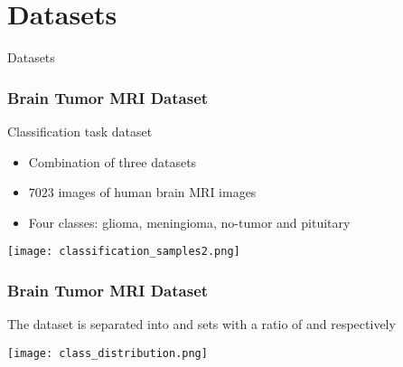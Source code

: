 \documentclass[../presentation.tex]{subfiles} %
\begin{document}
\section{Datasets}

\begin{frame}
	\begin{cbox}
		{\fontsize{20pt}{7.2}\selectfont Datasets}
	\end{cbox}
\end{frame}

\begin{frame}

    \frametitle{Brain Tumor MRI Dataset}

		Classification task dataset

    \begin{cbox}
        \begin{itemize}
            \item Combination of three datasets
            \item $7023$ images of human brain MRI images
            \item Four classes: glioma, meningioma, no-tumor and pituitary
        \end{itemize}
    \end{cbox}


    \begin{center}
        \texttt{[image: classification\_samples2.png]}
    \end{center}

\end{frame}

\begin{frame}
    
    \frametitle{Brain Tumor MRI Dataset}

    \begin{cbox}
			The dataset is separated into  and  sets
			with a ratio of  and  respectively
    \end{cbox}

    \begin{center}
        \texttt{[image: class\_distribution.png]}
    \end{center}

\end{frame}
\end{document}

